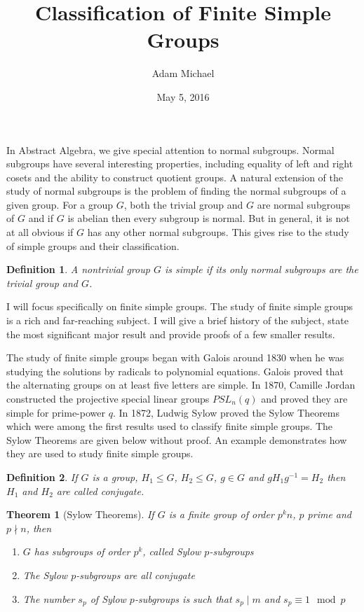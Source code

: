 \documentclass[a4paper]{article}
\title{Classification of Finite Simple Groups}
\author{Adam Michael}
\date{May 5, 2016}
\begin{document}
\maketitle

\newtheorem{theorem}{Theorem}
\newtheorem{lemma}{Lemma}
\newtheorem{definition}{Definition}
\newtheorem{example}{Example}

In Abstract Algebra, we give special attention to normal subgroups. Normal subgroups have several interesting properties, including equality of left and right cosets and the ability to construct quotient groups. A natural extension of the study of normal subgroups is the problem of finding the normal subgroups of a given group. For a group $G$, both the trivial group and $G$ are normal subgroups of $G$ and if $G$ is abelian then every subgroup is normal. But in general, it is not at all obvious if $G$ has any other normal subgroups. This gives rise to the study of simple groups and their classification.

\begin{definition}
A nontrivial group $G$ is simple if its only normal subgroups are the trivial group and $G$.
\end{definition}

I will focus specifically on finite simple groups. The study of finite simple groups is a rich and far-reaching subject. I will give a brief history of the subject, state the most significant major result and provide proofs of a few smaller results.

The study of finite simple groups began with Galois around 1830 when he was studying the solutions by radicals to polynomial equations. Galois proved that the alternating groups on at least five letters are simple. In 1870, Camille Jordan constructed the projective special linear  groups $PSL_n(q)$ and proved they are simple for prime-power $q$. In 1872, Ludwig Sylow proved the Sylow Theorems which were among the first results used to classify finite simple groups. The Sylow Theorems are given below without proof. An example demonstrates how they are used to study finite simple groups.

\begin{definition}
If $G$ is a group, $H_1 \le G$, $H_2 \le G$, $g \in G$ and $g H_1 g^{-1} = H_2$ then $H_1$ and $H_2$ are called conjugate.
\end{definition}

\begin{theorem}[Sylow Theorems]
If $G$ is a finite group of order $p^k n$, $p$ prime and $p \nmid n$, then
\begin{enumerate}
	\item $G$ has subgroups of order $p^k$, called Sylow $p$-subgroups
	\item The Sylow $p$-subgroups are all conjugate
	\item The number $s_p$ of Sylow $p$-subgroups is such that $s_p \mid m$ and $s_p \equiv 1 \mod p$	
\end{enumerate}
\end{theorem}
\end{document}
